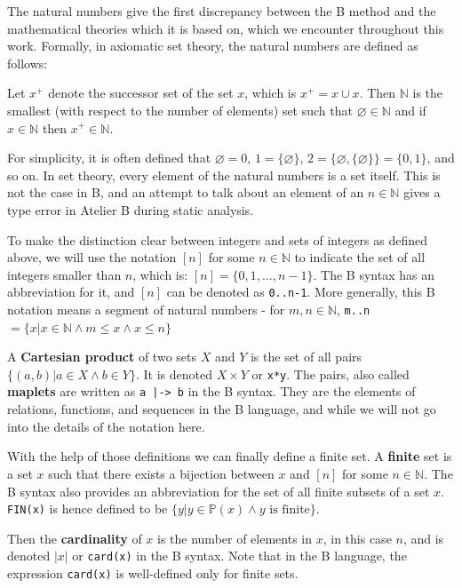 \documentclass[11pt,journal]{IEEEtran}
\begin{document}
	The natural numbers give the first discrepancy between the B method and the mathematical theories which it is based on, which we encounter throughout this work. Formally, in axiomatic set theory, the natural numbers are defined as follows:
	
	Let $x^+$ denote the successor set of the set $x$, which is $x^+ = x \cup {x}$. Then $\mathbb{N}$ is the smallest (with respect to the number of elements) set such that $\varnothing \in \mathbb{N}$ and if $x \in \mathbb{N}$ then $x^+ \in \mathbb{N}$.
	
	For simplicity, it is often defined that $\varnothing = 0$, $1 = \{\varnothing \}$, $2 = \{\varnothing , \{\varnothing\} \} = \{0,1\}$, and so on. In set theory, every element of the natural numbers is a set itself. This is not the case in B, and an attempt to talk about an element of an $n \in \mathbb{N}$ gives a type error in Atelier B during static analysis.
	
	To make the distinction clear between integers and sets of integers as defined above, we will use the notation $[n]$ for some $n \in \mathbb{N}$ to indicate the set of all integers smaller than $n$, which is: $[n] = \{0,1, ...,n-1\}$. The B syntax has an abbreviation for it, and $[n]$ can be denoted as \texttt{0..n-1}. More generally, this B notation means a segment of natural numbers - for $m, n \in \mathbb{N}$, \texttt{m..n} $= \{x | x \in \mathbb{N} \wedge m \leq x \wedge x \leq n\}$
	
	A \textbf{Cartesian product} of two sets $X$ and $Y$ is the set of all pairs $\{(a,b) | a \in X \wedge b \in Y  \}$. It is denoted $X \times Y$ or \texttt{x*y}. The pairs, also called \textbf{maplets} are written as \texttt{a~|->~b} in the B syntax. They are the elements of relations, functions, and sequences in the B language, and while we will not go into the details of the notation here.
	
	With the help of those definitions we can finally define a finite set. A \textbf{finite} set is a set $x$ such that there exists a bijection between $x$ and $[n]$ for some $n \in \mathbb{N}$.  The B syntax also provides an abbreviation for the set of all finite subsets of a set $x$. \texttt{FIN(x)} is hence defined to be $\{y| y \in \mathbb{P}(x) \wedge y \text{ is finite} \}$.
	
	Then the \textbf{cardinality} of $x$ is the number of elements in $x$, in this case $n$, and is denoted $|x|$ or \texttt{card(x)} in the B syntax. Note that in the B language, the expression \texttt{card(x)} is well-defined only for finite sets.
	
\end{document}
